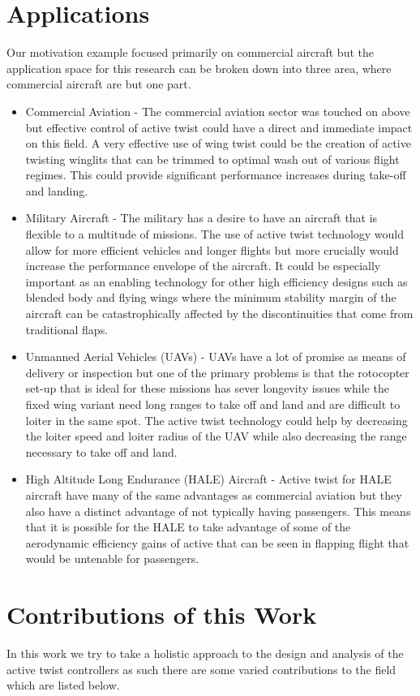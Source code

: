\documentclass[11pt]{ucthesis}
\begin{document}
\section{Applications}
Our motivation example focused primarily on commercial aircraft but the application space for this research can be broken down into three area, where commercial aircraft are but one part.
\begin{itemize}
\item Commercial Aviation - The commercial aviation sector was touched on above but effective control of active twist could have a direct and immediate impact on this field. A very effective use of wing twist could be the creation of active twisting winglits that can be trimmed to optimal wash out of various flight regimes. This could provide significant performance increases during take-off and landing.
\item Military Aircraft - The military has a desire to have an aircraft that is flexible to a multitude of missions. The use of active twist technology would allow for more efficient vehicles and longer flights but more crucially would increase the performance envelope of the aircraft. It could be especially important as an enabling technology for other high efficiency designs such as blended body and flying wings where the minimum stability margin of the aircraft can be catastrophically affected by the discontinuities that come from traditional flaps.
\item Unmanned Aerial Vehicles (UAVs) - UAVs have a lot of promise as means of delivery or inspection but one of the primary problems is that the rotocopter set-up that is ideal for these missions has sever longevity issues while the fixed wing variant need long ranges to take off and land and are difficult to loiter in the same spot. The active twist technology could help by decreasing the loiter speed and loiter radius of the UAV while also decreasing the range necessary to take off and land.
\item High Altitude Long Endurance (HALE) Aircraft - Active twist for HALE aircraft have many of the same advantages as commercial aviation but they also have a distinct advantage of not typically having passengers. This means that it is possible for the HALE to take advantage of some of the aerodynamic efficiency gains of active that can be seen in flapping flight that would be untenable for passengers.
\end{itemize}

\section{Contributions of this Work}
In this work we try to take a holistic approach to the design and analysis of the active twist controllers as such there are some varied contributions to the field which are listed below.
\end{document}
